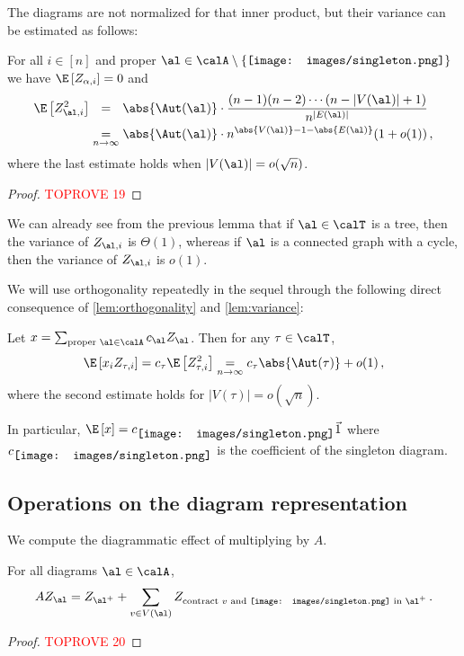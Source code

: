 \documentclass[12pt]{article}
\newcommand{\rootpic}{\vcenter{\hbox{\texttt{[image: images/singleton.png]}}}}
\newcommand{\smallrootpic}{\vcenter{\hbox{\texttt{[image: images/singleton.png]}}}}
\begin{document}
The diagrams are not normalized for that inner product, but their variance can be estimated as follows:

\begin{lemma}\label{lem:variance}
    For all $i \in [n]$ and proper $\al \in \calA\setminus\{\rootpic\}$ 
    we have $\E \left[Z_{\alpha,i}\right]=0$ and
    \begin{align*}
        \E\left[Z_{\al, i}^2\right] &\underset{\phantom{n\to\infty}}{=} \abs{\Aut(\al)} \cdot \frac{(n-1)(n-2)\cdots(n-|V(\al)| + 1)}{n^{|E(\al)|}} \\
        &\underset{n\to\infty}{=} \abs{\Aut(\al)} \cdot n^{\abs{V(\al)} - 1 - \abs{E(\al)}} (1 + o(1))\,,
    \end{align*}
    where the last estimate holds when $|V(\al)| = o(\sqrt{n})$.
\end{lemma}
\begin{proof}\textcolor{red}{TOPROVE 19}\end{proof}

We can already see from the previous lemma that if $\al \in \calT$ is a tree,
then the variance of $Z_{\al,i}$ is $\Theta(1)$,
whereas if $\al$ is a connected graph with a cycle, then the variance of $Z_{\al,i}$ is $o(1)$.

We will use orthogonality repeatedly in the sequel through the following direct consequence of \cref{lem:orthogonality} and \cref{lem:variance}:

\begin{corollary}
\label{lem:constant}
    Let $x = \sum_{\textnormal{proper }\al \in \calA} c_\al Z_\al$. Then for any $\tau\in\calT$,
    \[
        \E\left[x_i Z_{\tau,i}\right] = c_\tau \E\left[Z_{\tau,i}^2\right] 
        \underset{n\to\infty}{=} c_\tau \abs{\Aut(\tau)} + o(1)\,,
    \]
    where the second estimate holds for $|V(\tau)| = o(\sqrt{n})$.

    In particular, $\E \left[x\right] = c_{\smallrootpic} \vec{1}$ where $c_{\smallrootpic}$
    is the coefficient of the singleton diagram.
\end{corollary}


\subsection{Operations on the diagram representation}
\label{sec:derivation-asymptotic}

We compute the diagrammatic effect of multiplying by $A$.
\begin{lemma}\label{lem:mat-mul}
    For all diagrams $\al \in \calA$,
    \[AZ_\al = Z_{\al^+} + \sum_{v \in V(\al)} Z_{\textnormal{contract $v$ and $\rootpic$ in $\al^+$}}\,.\]
\end{lemma}
\begin{proof}\textcolor{red}{TOPROVE 20}\end{proof}
\end{document}
